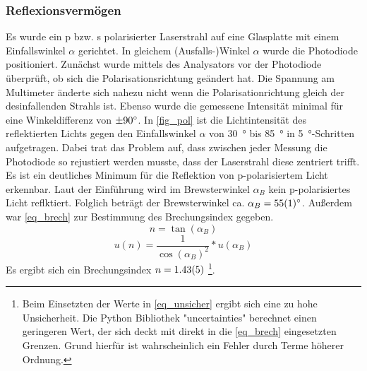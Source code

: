 \documentclass[
	a4paper,
	12pt,
	pagesize,
	ngerman
]{scrartcl}
\begin{document}
	\subsubsection{Reflexionsvermögen}
	Es wurde ein p bzw. s polarisierter Laserstrahl auf eine Glasplatte mit einem Einfallswinkel $\alpha$ gerichtet.
	In gleichem (Ausfalls-)Winkel $\alpha$ wurde die Photodiode positioniert.
	Zunächst wurde mittels des Analysators vor der Photodiode überprüft, ob sich die Polarisationsrichtung geändert hat. 
	Die Spannung am Multimeter änderte sich nahezu nicht wenn die Polarisationrichtung gleich der desinfallenden Strahls ist. 
	Ebenso wurde die gemessene Intensität minimal für eine Winkeldifferenz von $\SI{\pm90}{\degree}$.
	In \cref{fig_pol} ist die Lichtintensität des reflektierten Lichts gegen den Einfallswinkel $\alpha$ von \SI{30}{\degree} bis \SI{85}{\degree} in \SI{5}{\degree}-Schritten aufgetragen.
	Dabei trat das Problem auf, dass zwischen jeder Messung die Photodiode so rejustiert werden musste, dass der Laserstrahl diese zentriert trifft.
	Es ist ein deutliches Minimum für die Reflektion von p-polarisiertem Licht erkennbar.
	Laut der Einführung wird im Brewsterwinkel $\alpha_B$ kein p-polarisiertes Licht reflktiert.
	Folglich beträgt der Brewsterwinkel ca. $\alpha_B = \SI{55+-1}{\degree}$.
	Außerdem war \cref{eq_brech} zur Bestimmung des Brechungsindex gegeben.
	\begin{equation}
		n= \tan(\alpha_B)
		\label{eq_brech}
	\end{equation}
	\begin{equation}
		u(n) = \frac{1}{\cos(\alpha_B)^2}*u(\alpha_B)
		\label{eq_unsicher}
	\end{equation}
	Es ergibt sich ein Brechungsindex $n = \SI{1,43 +- 0,05}{}$
	\footnote{Beim Einsetzten der Werte in \cref{eq_unsicher} ergibt sich eine zu hohe Unsicherheit. Die Python Bibliothek "uncertainties" berechnet einen geringeren Wert, der sich deckt mit direkt in die \cref{eq_brech} eingesetzten Grenzen. Grund hierfür ist wahrscheinlich ein Fehler durch Terme höherer Ordnung.}.
\end{document}

